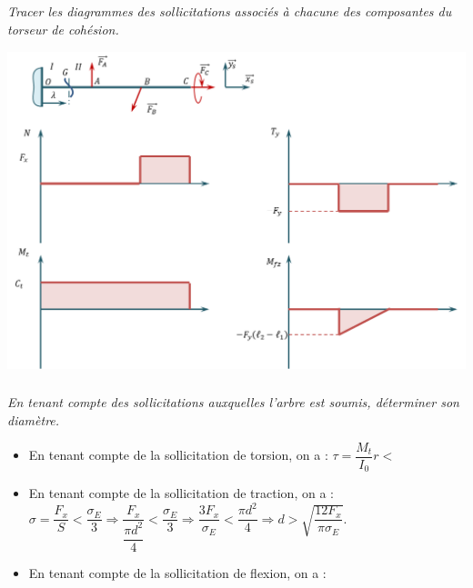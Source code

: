 \documentclass[10pt,fleqn]{article} %
\begin{document}
\begin{multicols}{2}
\subparagraph{}\textit{Tracer les diagrammes des sollicitations associés à chacune des composantes du torseur de cohésion.}
\begin{center}
\includegraphics[width=.95\linewidth]{images/corr_02}
\end{center}

\subparagraph{}\textit{En tenant compte des sollicitations auxquelles l'arbre est soumis, déterminer son diamètre.}
\begin{itemize}
\item En tenant compte de la sollicitation de torsion, on a : $ \tau = \dfrac{M_t}{I_{0}}r < $ 
\item En tenant compte de la sollicitation de traction, on a : $\sigma=\dfrac{F_x}{S}<\dfrac{\sigma_E}{3}\Rightarrow \dfrac{F_x}{\dfrac{\pi d^2}{4}}<\dfrac{\sigma_E}{3} 
\Rightarrow \dfrac{3 F_x}{\sigma_E}< \dfrac{\pi d^2}{4}
\Rightarrow d > \sqrt{\dfrac{12 F_x}{\pi \sigma_E}}$. 
\item En tenant compte de la sollicitation de flexion, on a : 
\end{itemize}
\ifprof
\else
\end{multicols}
\fi
\end{document}
